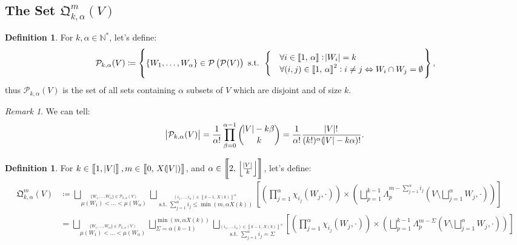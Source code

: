 \documentclass{article}
\theoremstyle{definition}
\newtheorem{definition}[lemma]{Definition}
\theoremstyle{remark}
\newtheorem*{remark}{Remark}
\newcommand{\N}{\mathbb N}
\newcommand{\intint}[2]{\left\llbracket#1, \, #2\right\rrbracket}
\newcommand{\floor}[1]{\left\lfloor#1\right\rfloor}
\newcommand{\st}{\text{ s.t. }}
\begin{document}
	\subsection{The Set $\mathfrak Q_{k,\alpha}^m(V)$}
			\begin{definition} For $k, \alpha \in \N^*$, let's define:
			\[\mathcal P_{k,\alpha}(V) \coloneqq \left\{\{W_1, \ldots, W_\alpha\} \in \mathcal P\left(\mathcal P(V)\right) \st
				\begin{cases}
						&\forall i \in \intint 1\alpha : \abs {W_i} = k \\
						&\forall (i, j) \in \intint 1\alpha^2 : i \neq j \Leftrightarrow W_i \cap W_j = \emptyset
					\end{cases}
			\right\},\]
			thus $\mathcal P_{k,\alpha}(V)$ is the set of all sets containing $\alpha$ subsets of $V$ which are disjoint and of size $k$.
			\end{definition}

			\begin{remark} We can tell:
			\[\abs {\mathcal P_{k,\alpha}(V)} = \frac 1{\alpha!}\prod_{\beta=0}^{\alpha-1}\binom {\abs V-k\beta}k = \frac 1{\alpha!}\frac {\abs V!}{(k!)^\alpha(\abs V-k\alpha)!}.\]
			\end{remark}

			\begin{definition} For $k \in \intint 1{\abs V}, m \in \intint 0{X(\abs V)}$, and $\alpha \in \intint 2{\floor {\frac {\abs V}k}}$, let's define:
			\begin{align*}
				\mathfrak Q_{k,\alpha}^m(V) &\coloneqq
						\bigsqcup_{\stackrel {\{W_1, \ldots, W_\alpha\} \in \mathcal P_{k,\alpha}(V)}{\mu(W_1) < \ldots < \mu(W_\alpha)}}
							\bigsqcup_{\stackrel {(i_1, \ldots, i_\alpha) \in \intint {k-1}{X(k)}^\alpha}{\st \sum_{j=1}^\alpha i_j \leq \min\left(m, \alpha X(k)\right)}}
							\left[\left(\prod_{j=1}^\alpha \chi_{i_j}(W_j, \cdot)\right) \times \left(\bigsqcup_{p=1}^{k-1}
								\Lambda_p^{m-\sum_{j=1}^\alpha i_j}\left(V \setminus \bigsqcup_{j=1}^\alpha W_j, \cdot\right)\right)\right] \\
					&= \bigsqcup_{\stackrel {\{W_1, \ldots, W_\alpha\} \in \mathcal P_{k,\alpha}(V)}{\mu(W_1) < \ldots < \mu(W_\alpha)}}
						\bigsqcup_{\Sigma=\alpha(k-1)}^{\min\left(m, \alpha X(k)\right)}
						\bigsqcup_{\stackrel {(i_1, \ldots, i_\alpha) \in \intint {k-1}{X(k)}^\alpha}{\st \sum_{j=1}^\alpha i_j = \Sigma}}
							\left[\left(\prod_{j=1}^\alpha \chi_{i_j}(W_j, \cdot)\right) \times \left(\bigsqcup_{p=1}^{k-1}
								\Lambda_p^{m-\Sigma}\left(V \setminus \bigsqcup_{j=1}^\alpha W_j, \cdot\right)\right)\right]
			\end{align*}
			\end{definition}
\end{document}
